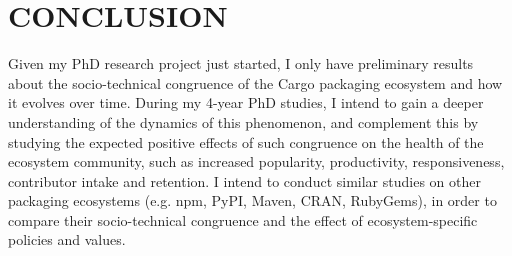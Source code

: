 \section{CONCLUSION}

Given my PhD research project just started, I only have preliminary results about the socio-technical congruence of the Cargo packaging ecosystem and how it evolves over time.
During my 4-year PhD studies, I intend to gain a deeper understanding of the dynamics of this phenomenon, and complement this by studying the expected positive effects of such congruence on the health of the ecosystem community, such as increased popularity, productivity, responsiveness, contributor intake and retention.
I intend to conduct similar studies on other packaging ecosystems  (e.g. npm, PyPI, Maven, CRAN, RubyGems), in order to compare their socio-technical congruence and the effect of ecosystem-specific policies and values.
